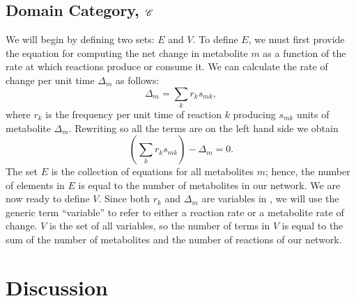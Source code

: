 \documentclass{article}
\begin{document}
\subsection{Domain Category, $\mathscr{C}$}

We will begin by defining two sets: $E$ and $V$.  To define $E$, we must first
provide the equation for computing the net change in metabolite $m$ as a
function of the rate at which reactions produce or consume it.  We can
calculate the rate of change per unit time $\Delta_m$ as follows:
\begin{equation} 
\Delta_m = \sum_{k} r_k s_{mk},
\label{eq:sm0}
\end{equation}
where $r_k$ is the frequency per unit time of reaction $k$ producing $s_{mk}$
units of metabolite $\Delta_m$.
Rewriting  so all the terms are on the left hand side we obtain
\begin{equation} 
\left(\sum_{k} r_k s_{mk} \right) - \Delta_m = 0.
\label{eq:sm1}
\end{equation}
The set $E$ is the collection of equations for all metabolites $m$; hence, the
number of elements in $E$ is equal to the number of metabolites in our network.
We are now ready to define $V$. Since both $r_k$ and $\Delta_m$ are variables
in , we will use the generic term ``variable'' to refer to either
a reaction rate or a metabolite rate of change. $V$ is the set of all
variables, so the number of terms in $V$ is equal to the sum of the number of
metabolites and the number of reactions of our network.



\section{Discussion}
\todo{}

        
        
\end{document}
